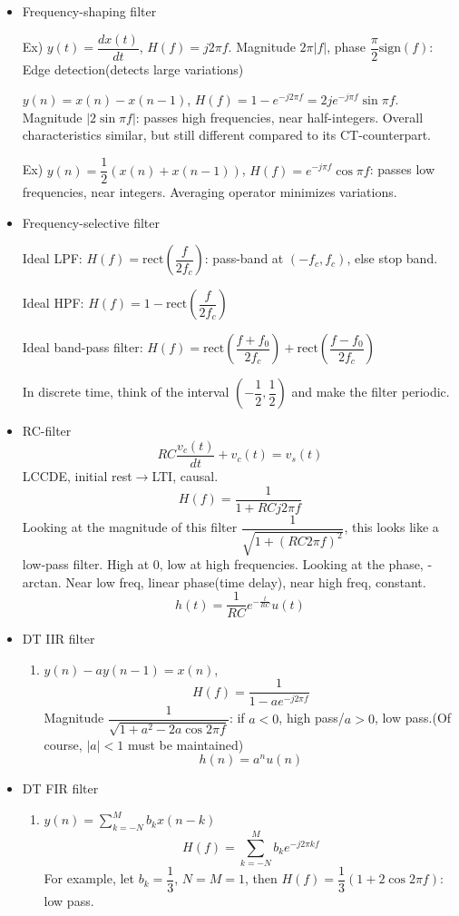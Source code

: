 \documentclass{article}
\begin{document}
\begin{itemize}
    \item Frequency-shaping filter
    
    Ex) $y(t)=\dfrac{dx(t)}{dt}$, $H(f)=j2\pi f$. Magnitude $2\pi|f|$, phase $\dfrac{\pi}{2}\mathrm{sign}(f)$: Edge detection(detects large variations)
    
    $y(n)=x(n)-x(n-1)$, $H(f)=1-e^{-j2\pi f}=2je^{-j\pi f}\sin{\pi f}$. Magnitude $|2\sin{\pi f}|$: passes high frequencies, near half-integers. Overall characteristics similar, but still different compared to its CT-counterpart.
    
    Ex) $y(n)=\dfrac{1}{2}(x(n)+x(n-1))$, $H(f)=e^{-j\pi f}\cos{\pi f}$: passes low frequencies, near integers. Averaging operator minimizes variations.
    
    \item Frequency-selective filter
    
    Ideal LPF: $H(f)=\mathrm{rect}\left(\dfrac{f}{2f_c}\right)$: pass-band at $(-f_c,f_c)$, else stop band.
    
    Ideal HPF: $H(f)=1-\mathrm{rect}\left(\dfrac{f}{2f_c}\right)$
    
    Ideal band-pass filter: $H(f)=\mathrm{rect}\left(\dfrac{f+f_0}{2f_c}\right)+\mathrm{rect}\left(\dfrac{f-f_0}{2f_c}\right)$
    
    In discrete time, think of the interval $(-\dfrac{1}{2}, \dfrac{1}{2})$ and make the filter periodic.
    
    \item RC-filter
    \[RC\frac{v_c(t)}{dt}+v_c(t)=v_s(t)\]
    LCCDE, initial rest$\rightarrow$LTI, causal.
    \[H(f)=\dfrac{1}{1+RCj2\pi f}\]
    Looking at the magnitude of this filter $\dfrac{1}{\sqrt{1+(RC2\pi f)^2}}$, this looks like a low-pass filter. High at 0, low at high frequencies. Looking at the phase, -arctan. Near low freq, linear phase(time delay), near high freq, constant.
    \[h(t)=\frac{1}{RC}e^{-\frac{t}{RC}}u(t)\]
    
    \item DT IIR filter
    \begin{enumerate}
        \item $y(n)-ay(n-1)=x(n)$, \[H(f)=\dfrac{1}{1-ae^{-j2\pi f}}\] Magnitude $\dfrac{1}{\sqrt{1+a^2-2a\cos{2\pi f}}}$: if $a<0$, high pass/$a>0$, low pass.(Of course, $|a|<1$ must be maintained)
        \[h(n)=a^nu(n)\]
    \end{enumerate}
    \item DT FIR filter
    \begin{enumerate}
        \item $y(n)=\displaystyle{\sum_{k=-N}^{M}b_kx(n-k)}$
        \[H(f)=\sum_{k=-N}^{M}b_ke^{-j2\pi kf}\]
        For example, let $b_k=\dfrac{1}{3}$, $N=M=1$, then $H(f)=\dfrac{1}{3}(1+2\cos{2\pi f})$: low pass.
    \end{enumerate}
\end{itemize}
\end{document}
